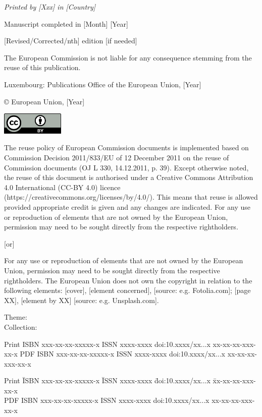 \thispagestyle{empty}

\vspace*{\fill}


\textit{Printed by [Xxx] in [Country]}

Manuscript completed in [Month] [Year]

[Revised/Corrected/nth] edition {\color{red}[if needed]}

The European Commission is not liable for any consequence stemming from the reuse of this publication. 

Luxembourg: Publications Office of the European Union, [Year]

© European Union, [Year] 

\includegraphics[width=3cm]{template_material/PicturesFiles/creative_commons_by.png}

The reuse policy of European Commission documents is implemented based on Commission Decision 2011/833/EU of 12 December 2011 on the reuse of Commission documents (OJ L 330, 14.12.2011, p. 39).
Except otherwise noted, the reuse of this document is authorised under a Creative Commons Attribution 4.0 International (CC-BY 4.0) licence (https://creativecommons.org/licenses/by/4.0/). This means that reuse is allowed provided appropriate credit is given and any changes are indicated.
For any use or reproduction of elements that are not owned by the European Union, permission may need to be sought directly from the respective rightholders. 

{\color{red}[or]}

For any use or reproduction of elements that are not owned by the European Union, permission may need to be sought directly from the respective rightholders. The European Union does not own the copyright in relation to the following elements:
[cover], [element concerned], [source: e.g. Fotolia.com];
[page XX], [element by XX] [source: e.g. Unsplash.com].

Theme:\\
Collection: 

Print	ISBN xxx-xx-xx-xxxxx-x	ISSN xxxx-xxxx	doi:10.xxxx/xx...x	xx-xx-xx-xxx-xx-x
PDF	ISBN xxx-xx-xx-xxxxx-x	ISSN xxxx-xxxx	doi:10.xxxx/xx...x	xx-xx-xx-xxx-xx-x

\begin{tabbing}
Print \hspace{1cm}\= ISBN xxx-xx-xx-xxxxx-x \hspace{1cm}\= ISSN xxxx-xxxx \hspace{1cm}\= doi:10.xxxx/xx...x \hspace{1cm}\= xx-xx-xx-xxx-xx-x\\
PDF	\> ISBN xxx-xx-xx-xxxxx-x \> ISSN xxxx-xxxx \> doi:10.xxxx/xx...x \> xx-xx-xx-xxx-xx-x
\end{tabbing}

\restoregeometry